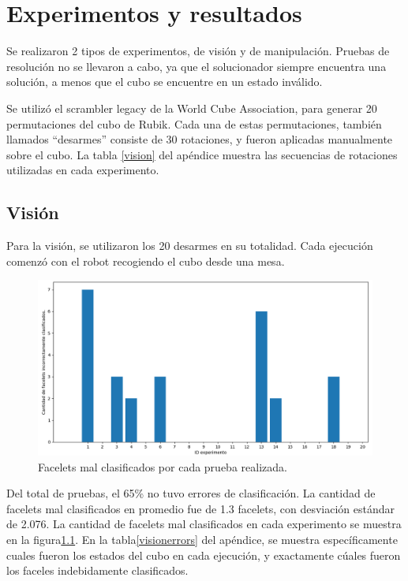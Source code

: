 \chapter{Experimentos y resultados}

Se realizaron 2 tipos de experimentos, de visión y de manipulación. Pruebas de resolución no se llevaron a cabo, ya que el solucionador siempre encuentra una solución, a menos que el cubo se encuentre en un estado inválido.

Se utilizó el scrambler legacy de la World Cube Association, para generar 20 permutaciones del cubo de Rubik. Cada una de estas permutaciones, también llamados ``desarmes'' consiste de 30 rotaciones, y fueron aplicadas manualmente sobre el cubo. La tabla \ref{vision} del apéndice muestra las secuencias de rotaciones utilizadas en cada experimento.

\section{Visión}
Para la visión, se utilizaron los 20 desarmes en su totalidad. Cada ejecución comenzó con el robot recogiendo el cubo desde una mesa.

\begin{figure}[h!]
	\centering
	\includegraphics[width=\textwidth]{figures/error_facelet}
	\caption{Facelets mal clasificados por cada prueba realizada.}
	\label{erroresfacelets}
\end{figure}
Del total de pruebas, el 65\% no tuvo errores de clasificación. La cantidad de facelets mal clasificados en promedio fue de 1.3 facelets, con desviación estándar de 2.076. La cantidad de facelets mal clasificados en cada experimento se muestra en la figura\ref{erroresfacelets}. En la tabla\ref{visionerrors} del apéndice, se muestra específicamente cuales fueron los estados del cubo en cada ejecución, y exactamente cúales fueron los faceles indebidamente clasificados.

